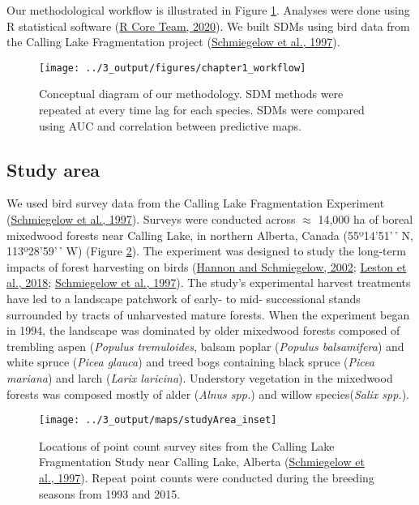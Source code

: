 \documentclass[
  12pt,
]{article}
\begin{document}
Our methodological workflow is illustrated in Figure \ref{fig:workflow}. Analyses were done using R statistical software (\protect\hyperlink{ref-R-base}{R Core Team, 2020}). We built SDMs using bird data from the Calling Lake Fragmentation project (\protect\hyperlink{ref-Schmiegelow1997}{Schmiegelow et al., 1997}).

\begin{figure}[htb]
\texttt{[image: ../3\_output/figures/chapter1\_workflow]} \caption{Conceptual diagram of our methodology. SDM methods were repeated at every time lag for each species. SDMs were compared using AUC and correlation between predictive maps.}\label{fig:workflow}
\end{figure}

\hypertarget{study-area}{%
\subsection{Study area}\label{study-area}}

We used bird survey data from the Calling Lake Fragmentation Experiment (\protect\hyperlink{ref-Schmiegelow1997}{Schmiegelow et al., 1997}). Surveys were conducted across \(\approx\) 14,000 ha of boreal mixedwood forests near Calling Lake, in northern Alberta, Canada (55º14'51'\,' N, 113º28'59'\,' W) (Figure \ref{fig:studyArea}). The experiment was designed to study the long-term impacts of forest harvesting on birds (\protect\hyperlink{ref-hannonCorridorsMayNot2002}{Hannon and Schmiegelow, 2002}; \protect\hyperlink{ref-lestonLongtermChangesBoreal2018}{Leston et al., 2018}; \protect\hyperlink{ref-Schmiegelow1997}{Schmiegelow et al., 1997}). The study's experimental harvest treatments have led to a landscape patchwork of early- to mid- successional stands surrounded by tracts of unharvested mature forests. When the experiment began in 1994, the landscape was dominated by older mixedwood forests composed of trembling aspen (\emph{Populus tremuloides}, balsam poplar (\emph{Populus balsamifera}) and white spruce (\emph{Picea glauca}) and treed bogs containing black spruce (\emph{Picea mariana}) and larch (\emph{Larix laricina}). Understory vegetation in the mixedwood forests was composed mostly of alder (\emph{Alnus spp.}) and willow species(\emph{Salix spp.}).


\begin{figure}[htb]
\texttt{[image: ../3\_output/maps/studyArea\_inset]} \caption{Locations of point count survey sites from the Calling Lake Fragmentation Study near Calling Lake, Alberta (\protect\hyperlink{ref-Schmiegelow1997}{Schmiegelow et al., 1997}). Repeat point counts were conducted during the breeding seasons from 1993 and 2015.}\label{fig:studyArea}
\end{figure}
\end{document}
